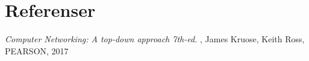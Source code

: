 \section{Referenser}
\begin{thebibliography}{999}


    \textit{Computer Networking: A top-down approach 7th-ed.} , James Kruose, Keith Ross,
	PEARSON, 2017
    \end{thebibliography}
